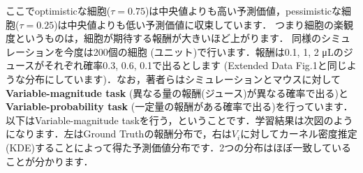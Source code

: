 ここでoptimisticな細胞($\tau=0.75$)は中央値よりも高い予測価値，pessimisticな細胞($\tau=0.25$)は中央値よりも低い予測価値に収束しています． つまり細胞の楽観度というものは，細胞が期待する報酬が大きいほど上がります．
同様のシミュレーションを今度は200個の細胞 (ユニット)で行います．報酬は0.1, 1, 2 μLのジュースがそれぞれ確率0.3, 0.6, 0.1で出るとします (Extended Data Fig.1と同じような分布にしています)．なお，著者らはシミュレーションとマウスに対して\textbf{Variable-magnitude task}
(異なる量の報酬(ジュース)が異なる確率で出る)と\textbf{Variable-probability task} (一定量の報酬がある確率で出る)を行っています．以下はVariable-magnitude taskを行う，ということです．学習結果は次図のようになります．左はGround Truthの報酬分布で，右は$V_i$に対してカーネル密度推定
(KDE)することによって得た予測価値分布です．2つの分布はほぼ一致していることが分かります．